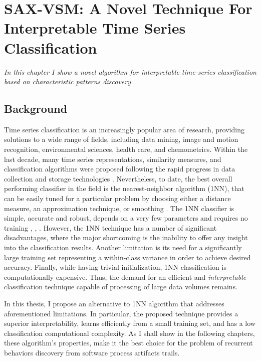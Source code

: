 \chapter{SAX-VSM: A Novel Technique For Interpretable Time Series Classification}\label{chapter_sax_vsm}

\textit{In this chapter I show a novel algorithm for interpretable time-series classification based on characteristic 
patterns discovery. }

\section{Background}
Time series classification is an increasingly popular area of research, providing solutions to a wide range of fields, 
including data mining, image and motion recognition, environmental sciences, health care, and chemometrics. 
Within the last decade, many time series representations, similarity measures, and classification algorithms were 
proposed following the rapid progress in data collection and storage technologies \cite{citeulike:10358271}. 
Nevertheless, to date, the best overall performing classifier in the field is the nearest-neighbor algorithm (1NN), 
that can be easily tuned for a particular problem by choosing either a distance measure, an approximation technique, 
or smoothing \cite{citeulike:10358271}.
The 1NN classifier is simple, accurate and robust, depends on a very few parameters 
and requires no training \cite{citeulike:10358271}, \cite{citeulike:532340}, \cite{citeulike:12563424}.
However, the 1NN technique has a number of significant disadvantages, where the major shortcoming is the 
inability to offer any insight into the classification results. Another limitation is its need for a significantly large 
training set representing a within-class variance in order to achieve desired accuracy. 
Finally, while having trivial initialization, 1NN classification is computationally expensive. 
Thus, the demand for an efficient and \textit{interpretable} classification technique capable of processing of large 
data volumes remains.

In this thesis, I propose an alternative to 1NN algorithm that addresses aforementioned limitations. 
In particular, the proposed technique provides a superior interpretability, learns efficiently from a small training set,
and has a low classification computational complexity. As I shall show in the following chapters, these algorithm's
properties, make it the best choice for the problem of recurrent behaviors discovery from software process artifacts trails.

